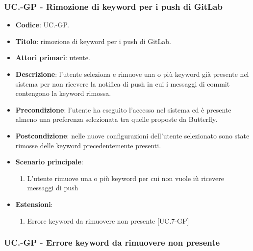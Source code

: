	\subsubsection{UC\theuccount.\thesubuccount-GP - Rimozione di keyword per i push di GitLab}
	\begin{itemize}
		\item \textbf{Codice}: UC\theuccount.\thesubuccount-GP.
		\item \textbf{Titolo}: rimozione di keyword per i push di GitLab.
		\item \textbf{Attori primari}: utente.
		\item \textbf{Descrizione}: l’utente seleziona e rimuove una o più keyword già presente nel sistema per non ricevere la notifica di push in
		cui i messaggi di commit contengono la keyword rimossa.
		\item \textbf{Precondizione}: l’utente ha eseguito l'accesso nel sistema ed è presente almeno
        una preferenza selezionata tra quelle proposte da Butterfly.
		\item \textbf{Postcondizione}: nelle nuove configurazioni dell'utente selezionato sono state rimosse delle keyword precedentemente presenti.
		\item \textbf{Scenario principale}:
		\begin{enumerate}
			\item L'utente rimuove una o più keyword per cui non vuole iù ricevere messaggi di push
		\end{enumerate}
		\item \textbf{Estensioni}:
		\begin{enumerate}
			\item Errore keyword da rimuovere non presente [UC\theuccount.7-GP]
		\end{enumerate}
	\end{itemize}

	\subsubsection{UC\theuccount.\thesubuccount-GP - Errore keyword da rimuovere non presente}

